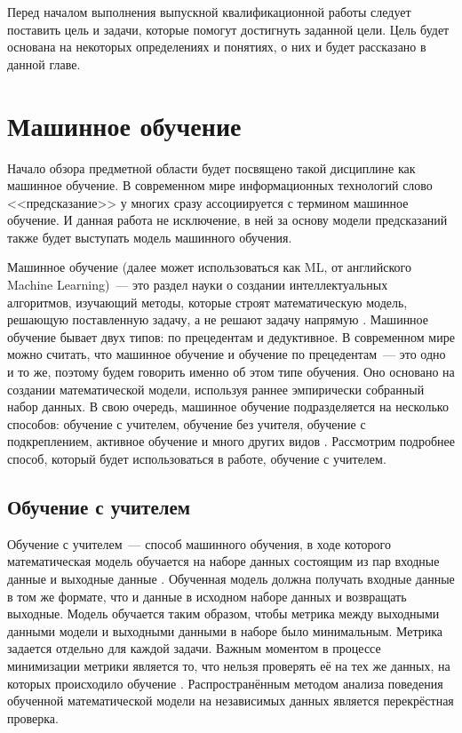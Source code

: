 Перед началом выполнения выпускной квалификационной работы следует поставить цель и задачи, которые помогут достигнуть заданной цели. Цель будет основана на некоторых определениях и понятиях, о них и будет рассказано в данной главе.
\section{Машинное обучение}
Начало обзора предметной области будет посвящено такой дисциплине как машинное обучение. В современном мире информационных технологий слово <<предсказание>> у многих сразу ассоциируется с термином машинное обучение. И данная работа не исключение, в ней за основу модели предсказаний также будет выступать модель машинного обучения. 

Машинное обучение (далее может использоваться как ML, от английского Machine Learning)~--- это раздел науки о создании интеллектуальных алгоритмов, изучающий методы, которые строят математическую модель, решающую поставленную задачу, а не решают задачу напрямую \cite{ml-main-book}. Машинное обучение бывает двух типов: по прецедентам и дедуктивное. В современном мире можно считать, что машинное обучение и обучение по прецедентам~--- это одно и то же, поэтому будем говорить именно об этом типе обучения. Оно основано на создании математической модели, используя раннее эмпирически собранный набор данных. В свою очередь, машинное обучение подразделяется на несколько способов: обучение с учителем, обучение без учителя, обучение с подкреплением, активное обучение и много других видов \cite{ml-methods-book}. Рассмотрим подробнее способ, который будет использоваться в работе, обучение с учителем.
    \subsection{Обучение с учителем}
Обучение с учителем~--- способ машинного обучения, в ходе которого математическая модель обучается на наборе данных состоящим из пар входные данные и выходные данные \cite{ml-methods-book}. Обученная модель должна получать входные данные в том же формате, что и данные в исходном наборе данных и возвращать выходные. Модель обучается таким образом, чтобы метрика между выходными данными модели и выходными данными в наборе было минимальным. Метрика задается отдельно для каждой задачи. Важным моментом в процессе минимизации метрики является то, что нельзя проверять её на тех же данных, на которых происходило обучение \cite{cross-validation-article}. Распространённым методом анализа поведения обученной математической модели на независимых данных является перекрёстная проверка. 
